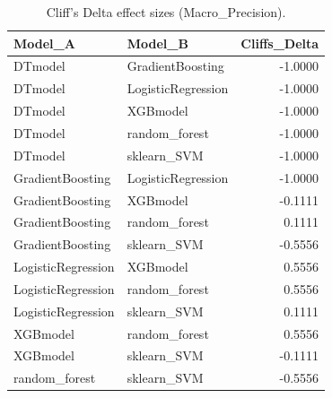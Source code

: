 \begin{table}[t]
\centering
\begin{tabular}{llr}
\toprule
Model_A & Model_B & Cliffs_Delta \\
\midrule
DTmodel & GradientBoosting & -1.0000 \\
DTmodel & LogisticRegression & -1.0000 \\
DTmodel & XGBmodel & -1.0000 \\
DTmodel & random_forest & -1.0000 \\
DTmodel & sklearn_SVM & -1.0000 \\
GradientBoosting & LogisticRegression & -1.0000 \\
GradientBoosting & XGBmodel & -0.1111 \\
GradientBoosting & random_forest & 0.1111 \\
GradientBoosting & sklearn_SVM & -0.5556 \\
LogisticRegression & XGBmodel & 0.5556 \\
LogisticRegression & random_forest & 0.5556 \\
LogisticRegression & sklearn_SVM & 0.1111 \\
XGBmodel & random_forest & 0.5556 \\
XGBmodel & sklearn_SVM & -0.1111 \\
random_forest & sklearn_SVM & -0.5556 \\
\bottomrule
\end{tabular}
\caption{Cliff's Delta effect sizes (Macro_Precision).}
\label{tab:cliffs_Macro_Precision}
\end{table}